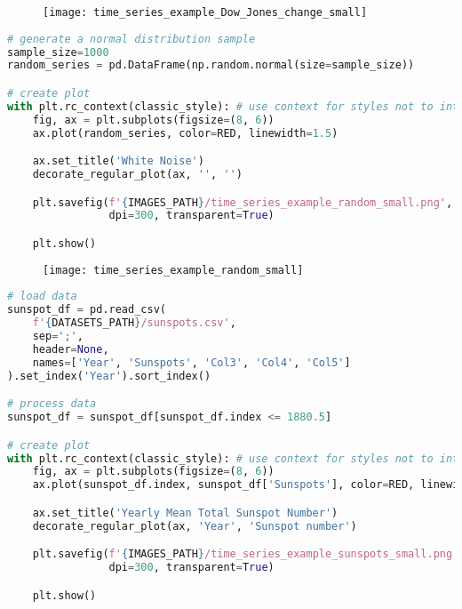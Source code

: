 \begin{figure}[h!]
  \centering
  \texttt{[image: time\_series\_example\_Dow\_Jones\_change\_small]}
\end{figure}\newpage


\begin{center}
  \begin{lstlisting}[language=Python, 
  caption={Белый шум.}, 
  label={lst:time_series_example_random_small}]
# generate a normal distribution sample
sample_size=1000
random_series = pd.DataFrame(np.random.normal(size=sample_size)) 

# create plot
with plt.rc_context(classic_style): # use context for styles not to interfere
    fig, ax = plt.subplots(figsize=(8, 6))
    ax.plot(random_series, color=RED, linewidth=1.5)

    ax.set_title('White Noise')
    decorate_regular_plot(ax, '', '')

    plt.savefig(f'{IMAGES_PATH}/time_series_example_random_small.png', 
                dpi=300, transparent=True)

    plt.show()
  \end{lstlisting}
\end{center}

\begin{figure}[h!]
  \centering
  \texttt{[image: time\_series\_example\_random\_small]}
\end{figure}\newpage


\begin{center}
  \begin{lstlisting}[language=Python, 
  caption={Среднегодовое общее количество солнечных пятен \cite{silso}.}, 
  label={lst:time_series_example_sunspots_small}]
# load data
sunspot_df = pd.read_csv(
    f'{DATASETS_PATH}/sunspots.csv',
    sep=';', 
    header=None, 
    names=['Year', 'Sunspots', 'Col3', 'Col4', 'Col5']
).set_index('Year').sort_index()

# process data
sunspot_df = sunspot_df[sunspot_df.index <= 1880.5]

# create plot
with plt.rc_context(classic_style): # use context for styles not to interfere
    fig, ax = plt.subplots(figsize=(8, 6))
    ax.plot(sunspot_df.index, sunspot_df['Sunspots'], color=RED, linewidth=1.5)

    ax.set_title('Yearly Mean Total Sunspot Number')
    decorate_regular_plot(ax, 'Year', 'Sunspot number')

    plt.savefig(f'{IMAGES_PATH}/time_series_example_sunspots_small.png', 
                dpi=300, transparent=True)

    plt.show()
  \end{lstlisting}
\end{center}


